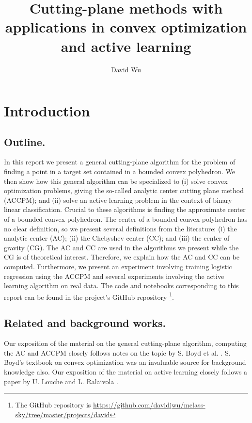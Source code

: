 \documentclass[11pt]{amsart}
\theoremstyle{definition}
\theoremstyle{remark}
\begin{document}
\lstset{language=}
\pagestyle{plain}

\title{Cutting-plane methods with applications in convex optimization and active learning}
\author{David Wu}

\maketitle


\section{Introduction}

    \subsection{Outline.}
        In this report we present a general cutting-plane algorithm for the problem of finding a point in a target set contained in a bounded convex polyhedron. We then show how this general algorithm can be specialized to (i) solve convex optimization problems, giving the so-called analytic center cutting plane method (ACCPM); and (ii) solve an active learning problem in the context of binary linear classification. Crucial to these algorithms is finding the approximate center of a bounded convex polyhedron. The center of a bounded convex polyhedron has no clear definition, so we present several definitions from the literature: (i) the analytic center (AC); (ii) the Chebyshev center (CC); and (iii) the center of gravity (CG). The AC and CC are used in the algorithms we present while the CG is of theoretical interest. Therefore, we explain how the AC and CC can be computed. Furthermore, we present an experiment involving training logistic regression using the ACCPM and several experiments involving the active learning algorithm on real data. The code and notebooks corresponding to this report can be found in the project's GitHub repository \footnote{The GitHub repository is \url{https://github.com/davidjwu/mclass-sky/tree/master/projects/david}}.

    \subsection{Related and background works.}
        Our exposition of the material on the general cutting-plane algorithm, computing the AC and ACCPM closely follows notes on the topic by S. Boyd et al. \cite{BVS08} \cite{BV11} \cite{BDV15}. S. Boyd's textbook on convex optimization \cite{BV04} was an invaluable source for background knowledge also. Our exposition of the material on active learning closely follows a paper by U. Louche and L. Ralaivola \cite{LR15}.
\end{document}

